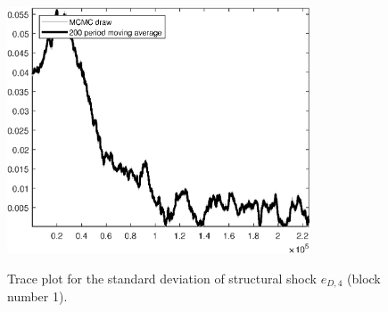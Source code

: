 \begin{figure}[H]
\centering
  \includegraphics[width=0.8\textwidth]{BRS_sectoral/graphs/TracePlot_SE_e_D_news_blck_1}\\
    \caption{Trace plot for the standard deviation of structural shock ${e_{D,4}}$ (block number 1).}
\end{figure}
